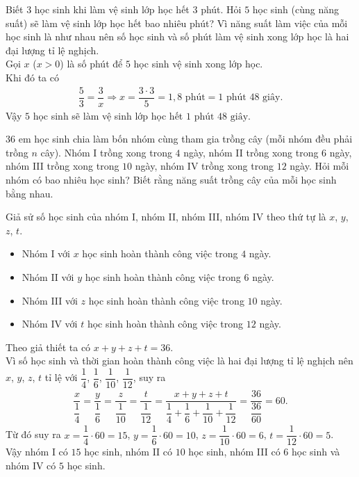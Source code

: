 \begin{vn}
	Biết $3$ học sinh khi làm vệ sinh lớp học hết $3$ phút. Hỏi $5$ học sinh (cùng năng suất) sẽ làm vệ sinh lớp học hết bao nhiêu phút?
	\loigiai
	{
		Vì năng suất làm việc của mỗi học sinh là như nhau nên số học sinh và số phút làm vệ sinh xong lớp học là hai đại lượng tỉ lệ nghịch.\\
		Gọi $x$ ($x>0$) là số phút để $5$ học sinh vệ sinh xong lớp học.\\
		Khi đó ta có
		\begin{eqnarray*}
			\dfrac{5}{3} = \dfrac{3}{x} \Rightarrow x=\dfrac{3 \cdot 3}{5} = 1{,}8 \text{ phút} = 1 \text{ phút } 48 \text{ giây}.
		\end{eqnarray*}
		Vậy $5$ học sinh sẽ làm vệ sinh lớp học hết $1 \text{ phút } 48 \text{ giây}$.
	}
\end{vn}

\begin{vn}
	$36$ em học sinh chia làm bốn nhóm cùng tham gia trồng cây (mỗi nhóm đều phải trồng $n$ cây). Nhóm I trồng xong trong $4$ ngày, nhóm II trồng xong trong $6$ ngày, nhóm III trồng xong trong $10$ ngày, nhóm IV trồng xong trong $12$ ngày. Hỏi mỗi nhóm có bao nhiêu học sinh? Biết rằng năng suất trồng cây của mỗi học sinh bằng nhau.
	\loigiai
	{
		Giả sử số học sinh của nhóm I, nhóm II, nhóm III, nhóm IV theo thứ tự là $x$, $y$, $z$, $t$.
		\begin{itemize}
			\item Nhóm I với $x$ học sinh hoàn thành công việc trong $4$ ngày.
			\item Nhóm II với $y$ học sinh hoàn thành công việc trong $6$ ngày.
			\item Nhóm III với $z$ học sinh hoàn thành công việc trong $10$ ngày.
			\item Nhóm IV với $t$ học sinh hoàn thành công việc trong $12$ ngày.
		\end{itemize}
		Theo giả thiết ta có $x+y+z+t=36$.\\
		Vì số học sinh và thời gian hoàn thành công việc là hai đại lượng tỉ lệ nghịch nên $x$, $y$, $z$, $t$ tỉ lệ với $\dfrac{1}{4}$, $\dfrac{1}{6}$, $\dfrac{1}{10}$, $\dfrac{1}{12}$, suy ra
		\begin{eqnarray*}
			\dfrac{x}{\dfrac{1}{4}} = \dfrac{y}{\dfrac{1}{6}} = \dfrac{z}{\dfrac{1}{10}} = \dfrac{t}{\dfrac{1}{12}} = \dfrac{x+y+z+t}{\dfrac{1}{4}+\dfrac{1}{6}+\dfrac{1}{10}+\dfrac{1}{12}} = \dfrac{36}{\dfrac{36}{60}} = 60.
		\end{eqnarray*}
		Từ đó suy ra $x=\dfrac{1}{4} \cdot 60 = 15$, $y=\dfrac{1}{6} \cdot 60 = 10$, $z=\dfrac{1}{10} \cdot 60 = 6$, $t=\dfrac{1}{12} \cdot 60 = 5$.\\
		Vậy nhóm I có $15$ học sinh, nhóm II có $10$ học sinh, nhóm III có $6$ học sinh và nhóm IV có $5$ học sinh.
	}
\end{vn}

